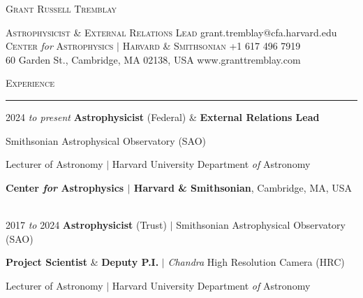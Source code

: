 \documentclass[11pt]{article}
\makeatletter
\def\vhrulefill#1{\leavevmode\leaders\hrule\@height#1\hfill \kern\z@}
\makeatother
\begin{document}
\thispagestyle{empty}

\begin{center}
\hspace*{0.5in}
{\Large \textsc{Grant Russell Tremblay}}\\
\end{center}
{\small
\hspace*{6mm}\textsc{Astrophysicist \& External Relations Lead} \hfill grant.tremblay@cfa.harvard.edu\\
\hspace*{6mm}\textsc{Center} \textit{for} \textsc{Astrophysics $|$ Harvard \& Smithsonian}  \hfill +1 617 496 7919\\
\hspace*{6mm}60 Garden St., Cambridge, MA 02138, USA \hfill www.granttremblay.com\\}



\textsc{Experience} \vhrulefill{0.4pt}


\vspace{2mm}


\hspace{2.5mm} 2024 \textit{to present} \hspace{13.5mm} \textbf{Astrophysicist} (Federal) \& \textbf{External Relations Lead}

\hspace{42mm} \parbox{5.15in}{Smithsonian Astrophysical Observatory (SAO)}

\hspace{42mm} \parbox{5.15in}{Lecturer of Astronomy $|$ Harvard University Department \textit{of} Astronomy}


\hspace{42mm} \parbox{5.15in}{ \textbf{Center \textit{for} Astrophysics $|$ Harvard \& Smithsonian}, Cambridge, MA, USA}\\


\hspace{2.5mm} 2017 \textit{to} 2024 \hspace{17mm} \textbf{Astrophysicist} (Trust) $|$ Smithsonian Astrophysical Observatory (SAO)


\hspace{42mm} \parbox{5.15in}{\textbf{Project Scientist} \& \textbf{Deputy P.I.} $|$ \textit{Chandra} High Resolution Camera (HRC)}


\hspace{42mm} \parbox{5.15in}{Lecturer of Astronomy $|$ Harvard University Department \textit{of} Astronomy}
\end{document}
